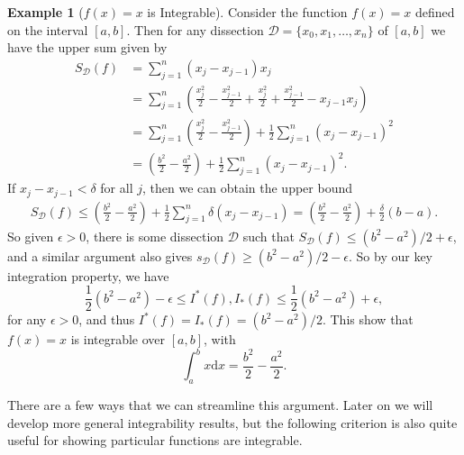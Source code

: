 \documentclass[11pt, a4paper]{article}
\theoremstyle{definition}
\newtheorem{example}[theorem]{Example}
\newcommand{\DD}{\mathcal{D}}
\newcommand{\dd}{\mathrm{d}}
\begin{document}
\begin{example}[$f(x) = x$ is Integrable]
	Consider the function $f(x) = x$ defined on the interval $[a, b]$. Then for any dissection $\DD = \{x_0, x_1, \dots, x_n\}$ of $[a, b]$ we have the upper sum given by
	\begin{align*}
		S_{\DD}(f) &= \sum_{j = 1}^{n} (x_j - x_{j - 1}) x_j \\
				&= \sum_{j = 1}^n \left(\frac{x_j^2}{2} - \frac{x_{j - 1}^2}{2}+ \frac{x_j^2}{2} + \frac{x_{j-1}^2}{2}- x_{j - 1}x_j\right) \\
				&= \sum_{j = 1}^n \left(\frac{x_j^2}{2} - \frac{x_{j - 1}^2}{2}\right) +\frac{1}{2} \sum_{j = 1}^{n}\left(x_j - x_{j - 1}\right)^2 \\
				&= \left(\frac{b^2}{2} - \frac{a^2}{2}\right) +\frac{1}{2} \sum_{j = 1}^{n}\left(x_j - x_{j - 1}\right)^2.
	\end{align*}
	If $x_{j} - x_{j - 1} < \delta$ for all $j$, then we can obtain the upper bound
	\begin{align*}
		S_{\DD}(f) \leq \left(\frac{b^2}{2} - \frac{a^2}{2}\right) +\frac{1}{2} \sum_{j = 1}^{n}\delta\left(x_j - x_{j - 1}\right) = \left(\frac{b^2}{2} - \frac{a^2}{2}\right) + \frac{\delta}{2}(b - a).
	\end{align*}
	So given $\epsilon > 0$, there is some dissection $\DD$ such that $S_{\DD}(f) \leq (b^2 - a^2)/2 + \epsilon$, and a similar argument also gives $s_{\DD}(f) \geq (b^2 - a^2)/2 - \epsilon$. So by our key integration property, we have
	$$
	\frac{1}{2}(b^2 - a^2) - \epsilon \leq I^*(f), I_*(f) \leq \frac{1}{2}(b^2 - a^2) + \epsilon,
	$$
	for any $\epsilon > 0$, and thus $I^*(f) = I_*(f) = (b^2 - a^2)/2$. This show that $f(x) = x$ is integrable over $[a, b]$, with
	$$
	\int_a^b x \dd x = \frac{b^2}{2} - \frac{a^2}{2}.
	$$
\end{example}

There are a few ways that we can streamline this argument. Later on we will develop more general integrability results, but the following criterion is also quite useful for showing particular functions are integrable.
\end{document}
